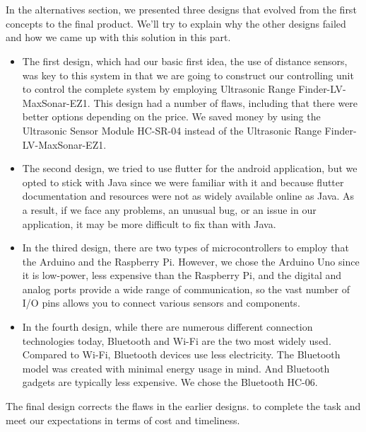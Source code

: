 \documentclass[12pt,a4paper]{report}
\begin{document}
\section{\fontsize{12}{12}\selectfont{Design Alternatives}}
In the alternatives section, we presented three designs that evolved from the first concepts to the final product. We'll try to explain why the other designs failed and how we came up with this solution in this part.
\begin{itemize}
\item The first design, which had our basic first idea, the use of distance sensors, was key to this system in that we are going to construct our controlling unit to control the complete system by employing Ultrasonic Range Finder-LV-MaxSonar-EZ1. This design had a number of flaws, including that there were better options depending on the price. We saved money by using the Ultrasonic Sensor Module HC-SR-04 instead of the Ultrasonic Range Finder-LV-MaxSonar-EZ1.

 \item The second design, we tried to use flutter for the android application, but we opted to stick with Java since we were familiar with it and because flutter documentation and resources were not as widely available online as Java. As a result, if we face any problems, an unusual bug, or an issue in our application, it may be more difficult to fix than with Java.

 \item In the thired design, there are two types of microcontrollers to employ that the Arduino and the Raspberry Pi. However, we chose the Arduino Uno since it is low-power, less expensive than the Raspberry Pi, and the digital and analog ports provide a wide range of communication, so the vast number of I/O pins allows you to connect various sensors and components.
 
  \item In the fourth design, while there are numerous different connection technologies today, Bluetooth and Wi-Fi are the two most widely used. Compared to Wi-Fi, Bluetooth devices use less electricity. The Bluetooth model was created with minimal energy usage in mind. And Bluetooth gadgets are typically less expensive. We chose the Bluetooth HC-06.
\end{itemize}

The final design corrects the flaws in the earlier designs. to complete the task and meet our expectations in terms of cost and timeliness.
\section{\fontsize{12}{12}\selectfont{System Analysis and Optimization}}
\end{document}
